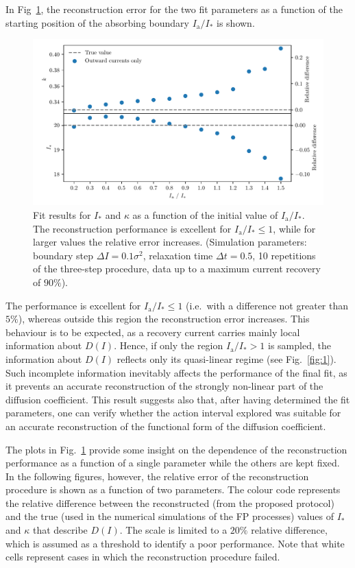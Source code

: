 In Fig~\ref{fig:different_position}, the reconstruction error for the two fit parameters as a function of the starting position of the absorbing boundary $I_\mathrm{a}/I_\ast$ is shown. 
%
\begin{figure}[htp]
    \centering
    \includegraphics[width=\textwidth]{4_probing_the_diffusive_behavior/figs/final/different_position.pdf}
    \caption{Fit results for $I_\ast$ and $\kappa$ as a function of the initial value of $I_\mathrm{a}/I_\ast$. The reconstruction performance is excellent for $I_\mathrm{a}/I_\ast \leq 1$, while for larger values the relative error increases. (Simulation parameters: boundary step $\Delta I=0.1 \sigma^2$, relaxation time $\Delta t=0.5$, 10 repetitions of the three-step procedure, data up to a maximum current recovery of $90\%$).}
    \label{fig:different_position}
\end{figure}
%
The performance is excellent for $I_\mathrm{a}/I_\ast \leq 1$ {(i.e.\ with a difference not greater than $5\%$)}, whereas outside this region the reconstruction error increases. This behaviour is to be expected, as a recovery current carries mainly local information about $D(I)$. Hence, if only the region $I_\mathrm{a}/I_\ast > 1$ is sampled, the information about $D(I)$ reflects only its quasi-linear regime (see Fig.~\ref{fig:1}). Such incomplete information inevitably affects the performance of the final fit, as it prevents an accurate reconstruction of the strongly non-linear part of the diffusion coefficient. This result suggests also that, after having determined the fit parameters, one can verify whether the action interval explored was suitable for an accurate reconstruction of the functional form of the diffusion coefficient.

The plots in Fig.~\ref{fig:different_position} provide some insight on the dependence of the reconstruction performance as a function of a single parameter while the others are kept fixed. In the following figures, however, the relative error of the reconstruction procedure is shown as a function of two parameters. The colour code represents the relative difference between the reconstructed (from the proposed protocol) and the true (used in the numerical simulations of the FP processes) values of $I_\ast$ and $\kappa$ that describe $D(I)$. The scale is limited to a $20\%$ relative difference, which is assumed as a threshold to identify a poor performance. Note that white cells represent cases in which the reconstruction procedure failed.

